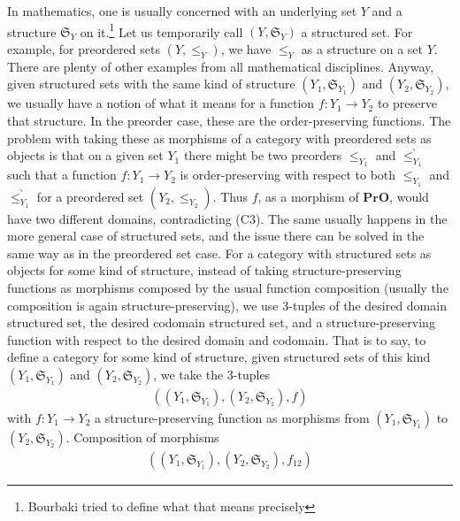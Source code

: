 \begin{rem}[(C3) Trick]
\label{rem:c3trick}
In mathematics, one is usually concerned with an underlying set $Y$ and a structure $\mathfrak{S}_{Y}$ on it.\footnote{Bourbaki tried to define what that means precisely} Let us temporarily call $(Y,\mathfrak{S}_{Y})$ a structured set.
For example, for preordered sets $(Y,\leq_{Y})$, we have $\leq_{Y}$ as a structure on a set $Y$.
There are plenty of other examples from all mathematical disciplines.
Anyway, given structured sets with the same kind of structure $(Y_{1},\mathfrak{S}_{Y_{1}})$ and $(Y_{2},\mathfrak{S}_{Y_{2}})$, we usually have a notion of what it means for a function $f \colon Y_{1} \rightarrow Y_{2}$ to preserve that structure.
In the preorder case, these are the order-preserving functions.
The problem with taking these as morphisms of a category with preordered sets as objects is that on a given set $Y_{1}$ there might be two preorders $\leq_{Y_{1}}$ and $\leq_{Y_{1}}^{\backprime}$ such that a function $f \colon Y_{1} \rightarrow Y_{2}$ is order-preserving with respect to both $\leq_{Y_{1}}$ and $\leq_{Y_{1}}^{\backprime}$ for a preordered set $(Y_{2},\leq_{Y_{2}})$.
Thus $f$, as a morphism of $\mathbf{PrO}$, would have two different domains, contradicting (C3).
The same usually happens in the more general case of structured sets, and the issue there can be solved in the same way as in the preordered set case.
For a category with structured sets as objects for some kind of structure, instead of taking structure-preserving functions as morphisms composed by the usual function composition (usually the composition is again structure-preserving), we use $3$-tuples of the desired domain structured set, the desired codomain structured set, and a structure-preserving function with respect to the desired domain and codomain.
That is to say, to define a category for some kind of structure, given structured sets of this kind $(Y_{1},\mathfrak{S}_{Y_{1}})$ and $(Y_{2},\mathfrak{S}_{Y_{2}})$, we take the $3$-tuples
\begin{align*}
  \left(
    (Y_{1},\mathfrak{S}_{Y_{1}}),
    (Y_{2},\mathfrak{S}_{Y_{2}}),
    f
  \right)
\end{align*}
with $f \colon Y_{1} \rightarrow Y_{2}$ a structure-preserving function as morphisms from $(Y_{1},\mathfrak{S}_{Y_{1}})$ to $(Y_{2},\mathfrak{S}_{Y_{2}})$.
Composition of morphisms
\begin{align*}
  \left(
    (Y_{1},\mathfrak{S}_{Y_{1}}),
    (Y_{2},\mathfrak{S}_{Y_{2}}),
    f_{12}
  \right)
\end{align*}

\end{rem}
